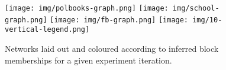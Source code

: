 \begin{figure}[!ht]
	\centering
	\texttt{[image: img/polbooks-graph.png]}
	\texttt{[image: img/school-graph.png]}
	\texttt{[image: img/fb-graph.png]}
	\texttt{[image: img/10-vertical-legend.png]}
	\caption{Networks laid out and coloured according to inferred block memberships for a given experiment iteration.}
	\label{fig:graphs-all}
\end{figure}
%
